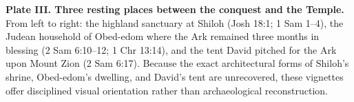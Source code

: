 \begin{platecaption}
\textbf{Plate III. Three resting places between the conquest and the Temple.} From left to right: the highland sanctuary at Shiloh (Josh 18:1; 1 Sam 1--4), the Judean household of Obed-edom where the Ark remained three months in blessing (2 Sam 6:10--12; 1 Chr 13:14), and the tent David pitched for the Ark upon Mount Zion (2 Sam 6:17). Because the exact architectural forms of Shiloh's shrine, Obed-edom's dwelling, and David's tent are unrecovered, these vignettes offer disciplined visual orientation rather than archaeological reconstruction.
\end{platecaption}

